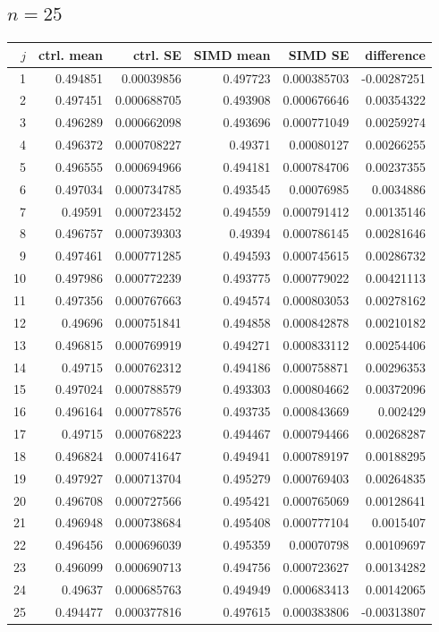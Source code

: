 \documentclass[10pt]{article}
\begin{document}
\subsection{$n=25$}
\begin{longtable}{rrrrrr}
\toprule
$j$ & ctrl. mean & ctrl. SE & SIMD mean & SIMD SE & difference\\
\midrule\endhead
1 & 0.494851 & 0.00039856 & 0.497723 & 0.000385703 & -0.00287251 \\
2 & 0.497451 & 0.000688705 & 0.493908 & 0.000676646 & 0.00354322 \\
3 & 0.496289 & 0.000662098 & 0.493696 & 0.000771049 & 0.00259274 \\
4 & 0.496372 & 0.000708227 & 0.49371 & 0.00080127 & 0.00266255 \\
5 & 0.496555 & 0.000694966 & 0.494181 & 0.000784706 & 0.00237355 \\
6 & 0.497034 & 0.000734785 & 0.493545 & 0.00076985 & 0.0034886 \\
7 & 0.49591 & 0.000723452 & 0.494559 & 0.000791412 & 0.00135146 \\
8 & 0.496757 & 0.000739303 & 0.49394 & 0.000786145 & 0.00281646 \\
9 & 0.497461 & 0.000771285 & 0.494593 & 0.000745615 & 0.00286732 \\
10 & 0.497986 & 0.000772239 & 0.493775 & 0.000779022 & 0.00421113 \\
11 & 0.497356 & 0.000767663 & 0.494574 & 0.000803053 & 0.00278162 \\
12 & 0.49696 & 0.000751841 & 0.494858 & 0.000842878 & 0.00210182 \\
13 & 0.496815 & 0.000769919 & 0.494271 & 0.000833112 & 0.00254406 \\
14 & 0.49715 & 0.000762312 & 0.494186 & 0.000758871 & 0.00296353 \\
15 & 0.497024 & 0.000788579 & 0.493303 & 0.000804662 & 0.00372096 \\
16 & 0.496164 & 0.000778576 & 0.493735 & 0.000843669 & 0.002429 \\
17 & 0.49715 & 0.000768223 & 0.494467 & 0.000794466 & 0.00268287 \\
18 & 0.496824 & 0.000741647 & 0.494941 & 0.000789197 & 0.00188295 \\
19 & 0.497927 & 0.000713704 & 0.495279 & 0.000769403 & 0.00264835 \\
20 & 0.496708 & 0.000727566 & 0.495421 & 0.000765069 & 0.00128641 \\
21 & 0.496948 & 0.000738684 & 0.495408 & 0.000777104 & 0.0015407 \\
22 & 0.496456 & 0.000696039 & 0.495359 & 0.00070798 & 0.00109697 \\
23 & 0.496099 & 0.000690713 & 0.494756 & 0.000723627 & 0.00134282 \\
24 & 0.49637 & 0.000685763 & 0.494949 & 0.000683413 & 0.00142065 \\
25 & 0.494477 & 0.000377816 & 0.497615 & 0.000383806 & -0.00313807 \\
\bottomrule
\end{longtable}
\end{document}
